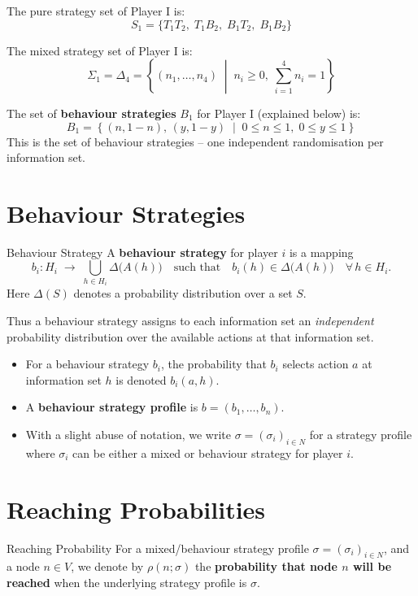 \documentclass[12pt, a4paper]{article}
\begin{document}
The pure strategy set of Player I is:
\[
  S_1 = \{T_1 T_2,\; T_1 B_2,\; B_1 T_2,\; B_1 B_2\}
\]

The mixed strategy set of Player I is:
\[
  \Sigma_1 = \Delta_4 = \left\{ (n_1, \ldots, n_4) \;\middle|\; n_i \geq 0,\; \sum_{i=1}^{4} n_i = 1 \right\}
\]

The set of \textbf{behaviour strategies} $B_1$ for Player I (explained below) is:
\[
  B_1 = \left\{ (n, 1-n),\, (y, 1-y) \;\middle|\; 0 \leq n \leq 1,\; 0 \leq y \leq 1 \right\}
\]
This is the set of behaviour strategies -- one independent randomisation per information set.

\section{Behaviour Strategies}

\begin{defbox}{Behaviour Strategy}
A \textbf{behaviour strategy} for player $i$ is a mapping
\[
  b_i : H_i \;\longrightarrow\; \bigcup_{h \in H_i} \Delta\bigl(A(h)\bigr)
  \quad \text{such that} \quad
  b_i(h) \in \Delta\bigl(A(h)\bigr) \quad \forall\, h \in H_i.
\]
Here $\Delta(S)$ denotes a probability distribution over a set $S$.
\end{defbox}

Thus a behaviour strategy assigns to each information set an \emph{independent} probability distribution over the available actions at that information set.

\begin{itemize}
  \item For a behaviour strategy $b_i$, the probability that $b_i$ selects action $a$ at information set $h$ is denoted $b_i(a, h)$.
  \item A \textbf{behaviour strategy profile} is $b = (b_1, \ldots, b_n)$.
  \item With a slight abuse of notation, we write $\sigma = (\sigma_i)_{i \in N}$ for a strategy profile where $\sigma_i$ can be either a mixed or behaviour strategy for player $i$.
\end{itemize}

\section{Reaching Probabilities}

\begin{defbox}{Reaching Probability}
For a mixed/behaviour strategy profile $\sigma = (\sigma_i)_{i \in N}$, and a node $n \in V$, we denote by $\rho(n; \sigma)$ the \textbf{probability that node $n$ will be reached} when the underlying strategy profile is $\sigma$.
\end{defbox}
\end{document}
